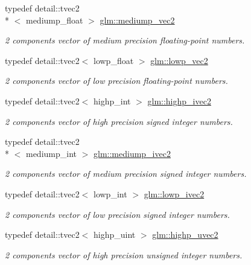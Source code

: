 \begin{DoxyCompactItemize}
typedef detail\-::tvec2\\*
$<$ mediump\-\_\-float $>$ \hyperlink{group__core__precision_gaa19e624188c7908ba28b9ef829e076f2}{glm\-::mediump\-\_\-vec2}
\begin{DoxyCompactList}\small\item\em 2 components vector of medium precision floating-\/point numbers. \end{DoxyCompactList}\item 
typedef detail\-::tvec2$<$ lowp\-\_\-float $>$ \hyperlink{group__core__precision_ga158d9bb292b42c86b36e8eaff3b22394}{glm\-::lowp\-\_\-vec2}
\begin{DoxyCompactList}\small\item\em 2 components vector of low precision floating-\/point numbers. \end{DoxyCompactList}\item 
typedef detail\-::tvec2$<$ highp\-\_\-int $>$ \hyperlink{group__core__precision_ga83738eb062e2e6b5e52cd0461da9c742}{glm\-::highp\-\_\-ivec2}
\begin{DoxyCompactList}\small\item\em 2 components vector of high precision signed integer numbers. \end{DoxyCompactList}\item 
typedef detail\-::tvec2\\*
$<$ mediump\-\_\-int $>$ \hyperlink{group__core__precision_ga4803c44369a1aea2e7e51397c341ce6f}{glm\-::mediump\-\_\-ivec2}
\begin{DoxyCompactList}\small\item\em 2 components vector of medium precision signed integer numbers. \end{DoxyCompactList}\item 
typedef detail\-::tvec2$<$ lowp\-\_\-int $>$ \hyperlink{group__core__precision_ga5e59209b39a7d334f8b4bad8c01ea045}{glm\-::lowp\-\_\-ivec2}
\begin{DoxyCompactList}\small\item\em 2 components vector of low precision signed integer numbers. \end{DoxyCompactList}\item 
typedef detail\-::tvec2$<$ highp\-\_\-uint $>$ \hyperlink{group__core__precision_ga1c56d043a20a6db84fc3d18b227875fb}{glm\-::highp\-\_\-uvec2}
\begin{DoxyCompactList}\small\item\em 2 components vector of high precision unsigned integer numbers. \end{DoxyCompactList}\item 

\end{DoxyCompactItemize}
